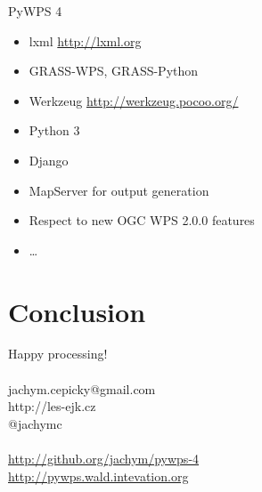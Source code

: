 \documentclass[xcolor=dvipsnames]{beamer}
\begin{document}
\begin{frame}{PyWPS 4}
    \begin{center}
    \end{center}
\end{frame}

\begin{frame}
    \begin{itemize}
        \item lxml \url{http://lxml.org}
        \item GRASS-WPS, GRASS-Python
        \item Werkzeug \url{http://werkzeug.pocoo.org/}
        \item Python 3
        \item Django
        \item MapServer for output generation
        \item Respect to new OGC WPS 2.0.0 features
        \item \dots
    \end{itemize}
\end{frame}

\section*{Conclusion}
\begin{frame}
    Happy processing!\\
    ~
    \\
    jachym.cepicky@gmail.com \\
    http://les-ejk.cz \\
    @jachymc\\
    ~
    \\
    \url{http://github.org/jachym/pywps-4}\\
    \url{http://pywps.wald.intevation.org}
\end{frame}
\end{document}
